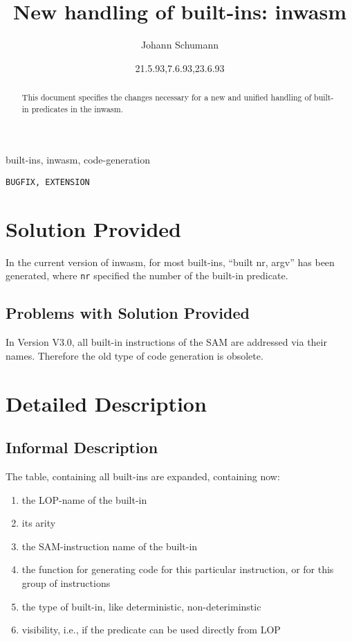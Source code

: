 

\title{New handling of built-ins: inwasm}
\author{Johann Schumann}
\date{21.5.93,7.6.93,23.6.93}



\maketitle

\begin{abstract}
This document specifies the changes necessary for a new and unified
handling of built-in predicates in the inwasm.

\end{abstract}

  built-ins, inwasm, code-generation

 {\tt BUGFIX, EXTENSION}

\section{Solution Provided}

In the current version of inwasm, for most built-ins,
``built nr, argv'' has been generated, where {\tt nr} specified the number
of the built-in predicate.


\subsection{Problems with Solution Provided}
	
In Version V3.0, all built-in instructions of the SAM are addressed
via their names. Therefore the old type of code generation is obsolete.

\section{Detailed Description}
\subsection{Informal Description}

The table, containing all built-ins are expanded, containing now:
\begin{enumerate}
\item
the LOP-name of the built-in
\item
its arity
\item
the SAM-instruction name of the built-in
\item
the function for generating code for this particular instruction,
or for this group of instructions
\item
the type of built-in, like deterministic, non-deteriminstic
\item
visibility, i.e., if the predicate can be used directly from LOP
\end{enumerate}

